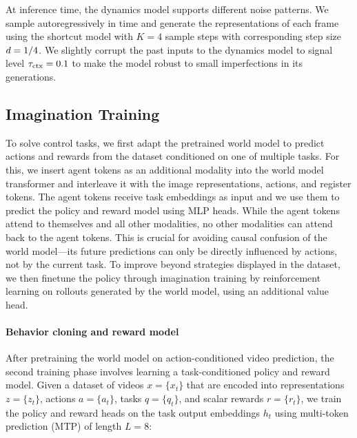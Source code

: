 \documentclass[11pt]{article}
\begin{document}

At inference time, the dynamics model supports different noise patterns.
We sample autoregressively in time and generate the representations of each frame using the shortcut model with $K=4$ sample steps with corresponding step size $d=1/4$.
We slightly corrupt the past inputs to the dynamics model to signal level $\tau_\mathrm{ctx}=0.1$ to make the model robust to small imperfections in its generations.

\subsection{Imagination Training}

To solve control tasks, we first adapt the pretrained world model to predict actions and rewards from the dataset conditioned on one of multiple tasks.
For this, we insert agent tokens as an additional modality into the world model transformer and interleave it with the image representations, actions, and register tokens.
The agent tokens receive task embeddings as input and we use them to predict the policy and reward model using MLP heads.
While the agent tokens attend to themselves and all other modalities, no other modalities can attend back to the agent tokens.
This is crucial for avoiding causal confusion of the world model---its future predictions can only be directly influenced by actions, not by the current task.
To improve beyond strategies displayed in the dataset, we then finetune the policy through imagination training by reinforcement learning on rollouts generated by the world model, using an additional value head.

\paragraph{Behavior cloning and reward model}

After pretraining the world model on action-conditioned video prediction, the second training phase involves learning a task-conditioned policy and reward model.
Given a dataset of videos $x=\{x_t\}$ that are encoded into representations $z=\{z_t\}$, actions $a=\{a_t\}$, tasks $q=\{q_t\}$, and scalar rewards $r=\{r_t\}$, we train the policy and reward heads on the task output embeddings $h_t$ using multi-token prediction (MTP) \citep{gloeckle2024mtp} of length $L=8$:

\end{document}

